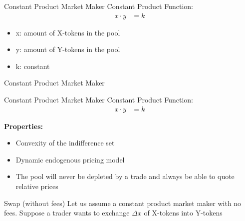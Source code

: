 \documentclass[]{beamer}
\begin{document}
\begin{frame}{Constant Product Market Maker}
Constant Product Function:
	\begin{align*}
		x \cdot y &= k
	\end{align*}

	\begin{itemize}
		\item[] x: amount of X-tokens in the pool
		\item[] y: amount of Y-tokens in the pool
		\item[] k: constant
	\end{itemize}
	\vspace{1cm}
\end{frame}


\begin{frame}{Constant Product Market Maker}
	\begin{figure}[h!]
		\begin{center}
			
		\end{center}
	\end{figure}
\end{frame}


\begin{frame}{Constant Product Market Maker}
Constant Product Function:
	\begin{align*}
		x \cdot y &= k
	\end{align*}
	
	\textbf{Properties:}
	\begin{itemize}
		\item<1-> Convexity of the indifference set
		\item<2-> Dynamic endogenous pricing model
		\item<3-> The pool will never be depleted by a trade and always be able to quote relative prices
	\end{itemize}
\end{frame}

\begin{frame}{Swap (without fees)}
	Let us assume a constant product market maker with no fees. Suppose a trader wants to exchange $\Delta x$ of X-tokens into Y-tokens
	\vspace{0.5cm}
	\begin{figure}[h!]
		\begin{center}
			
		\end{center}
	\end{figure}	
\end{frame}
\end{document}
